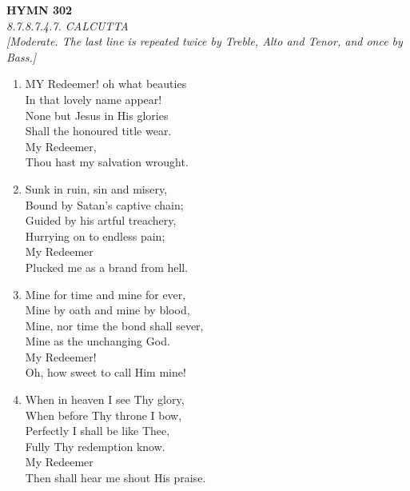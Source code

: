 \documentclass[11pt,a4paper]{article}
\begin{document}
\newpage
\begin{center}
    {\Large \textbf{HYMN 302}}
    \\
    \textit{8.7.8.7.4.7. CALCUTTA}
    \\
    \textit{\small [Moderate. The last line is repeated twice by Treble, Alto and Tenor, and once by Bass.]}
\end{center}
\vspace{1em}

\begin{enumerate}
    \item MY Redeemer! oh what beauties \\
        In that lovely name appear! \\
        None but Jesus in His glories \\
        Shall the honoured title wear. \\
        My Redeemer, \\
        Thou hast my salvation wrought.

    \item Sunk in ruin, sin and misery, \\
        Bound by Satan's captive chain; \\
        Guided by his artful treachery, \\
        Hurrying on to endless pain; \\
        My Redeemer \\
        Plucked me as a brand from hell.

    \item Mine for time and mine for ever, \\
        Mine by oath and mine by blood, \\
        Mine, nor time the bond shall sever, \\
        Mine as the unchanging God. \\
        My Redeemer! \\
        Oh, how sweet to call Him mine!

    \item When in heaven I see Thy glory, \\
        When before Thy throne I bow, \\
        Perfectly I shall be like Thee, \\
        Fully Thy redemption know. \\
        My Redeemer \\
        Then shall hear me shout His praise.

\end{enumerate}
\end{document}
